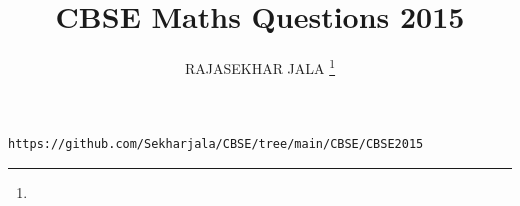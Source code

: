 \documentclass[journal,12pt,twocolumn]{IEEEtran}
\DeclareMathOperator*{\Res}{Res}
\begin{document}
\newtheorem{theorem}{Theorem}[section]
\newtheorem{problem}{Problem}
\newtheorem{proposition}{Proposition}[section]
\newtheorem{lemma}{Lemma}[section]
\newtheorem{corollary}[theorem]{Corollary}
\newtheorem{example}{Example}[section]
\newtheorem{definition}[problem]{Definition}
\newcommand{\BEQA}{\begin{eqnarray}}
\newcommand{\EEQA}{\end{eqnarray}}
\newcommand{\define}{\stackrel{\triangle}{=}}

\providecommand{\mbf}{\mathbf}
\providecommand{\pr}[1]{\ensuremath{\Pr\left(#1\right)}}
\providecommand{\qfunc}[1]{\ensuremath{Q\left(#1\right)}}
\providecommand{\sbrak}[1]{\ensuremath{{}\left[#1\right]}}
\providecommand{\lsbrak}[1]{\ensuremath{{}\left[#1\right.}}
\providecommand{\rsbrak}[1]{\ensuremath{{}\left.#1\right]}}
\providecommand{\brak}[1]{\ensuremath{\left(#1\right)}}
\providecommand{\lbrak}[1]{\ensuremath{\left(#1\right.}}
\providecommand{\rbrak}[1]{\ensuremath{\left.#1\right)}}
\providecommand{\cbrak}[1]{\ensuremath{\left\{#1\right\}}}
\providecommand{\lcbrak}[1]{\ensuremath{\left\{#1\right.}}
\providecommand{\rcbrak}[1]{\ensuremath{\left.#1\right\}}}
\theoremstyle{remark}
\newtheorem{rem}{Remark}
\newcommand{\sgn}{\mathop{\mathrm{sgn}}}
\providecommand{\abs}[1]{\left\vert#1\right\vert}
\providecommand{\res}[1]{\Res\displaylimits_{#1}} 
\providecommand{\norm}[1]{\left\lVert#1\right\rVert}
\providecommand{\mtx}[1]{\mathbf{#1}}
\providecommand{\mean}[1]{E\left[ #1 \right]}
\providecommand{\fourier}{\overset{\mathcal{F}}{ \rightleftharpoons}}
\providecommand{\system}{\overset{\mathcal{H}}{ \longleftrightarrow}}
\newcommand{\solution}{\noindent \textbf{Solution: }}
\newcommand{\cosec}{\,\text{cosec}\,}
\providecommand{\dec}[2]{\ensuremath{\overset{#1}{\underset{#2}{\gtrless}}}}
\newcommand{\myvec}[1]{\ensuremath{\begin{pmatrix}#1\end{pmatrix}}}
\newcommand{\mydet}[1]{\ensuremath{\begin{vmatrix}#1\end{vmatrix}}}
\makeatletter
{}
\makeatother
\let\StandardTheFigure\thefigure
\let\vec\mathbf
\renewcommand{\thefigure}{\theproblem}
\def\putbox#1#2#3{\makebox[0in][l]{\makebox[#1][l]{}\raisebox{\baselineskip}[0in][0in]{\raisebox{#2}[0in][0in]{#3}}}}
     \def\rightbox#1{\makebox[0in][r]{#1}}
     \def\centbox#1{\makebox[0in]{#1}}
     \def\topbox#1{\raisebox{-\baselineskip}[0in][0in]{#1}}
     \def\midbox#1{\raisebox{-0.5\baselineskip}[0in][0in]{#1}}
\vspace{3cm}
\title{CBSE Maths Questions 2015}
\author{RAJASEKHAR JALA
\thanks{}
	
}
\maketitle
\newpage
\bigskip
\renewcommand{\thefigure}{\theenumi}
\renewcommand{\thetable}{\theenumi}
\begin{lstlisting}
https://github.com/Sekharjala/CBSE/tree/main/CBSE/CBSE2015
\end{lstlisting}
\end{document}
